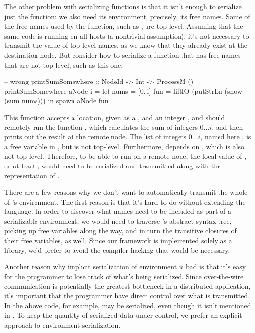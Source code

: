 \documentclass[preprint]{sigplanconf}
\begin{document}
The other problem with serializing functions is that it isn't enough to serialize just the function: we also need its environment, precisely, its free names. Some of the free names used by the  function, such as , are top-level. Assuming that the same code is running on all hosts (a nontrivial assumption), it's not necessary to transmit the value of top-level names, as we know that they already exist at the destination node. But consider how to serialize a function that has free names that are not top-level, such as this one:

\begin{code}
-- wrong
printSumSomewhere :: NodeId -> Int -> ProcessM ()
printSumSomewhere aNode i =
  let nums = [0..i]
      fun = liftIO (putStrLn (show (sum nums)))
   in spawn aNode fun
\end{code}

This function accepts a location, given as a , and an integer , and should remotely run the function , which calculates the sum of integers $0 \ldots i$, and then prints out the result at the remote node. The list of integers $0 \ldots i$, named here , is a free variable in , but is not top-level. Furthermore,  depends on , which is also not top-level. Therefore, to be able to run  on a remote node, the local value of , or at least , would need to be serialized and transmitted along with the representation of .

There are a few reasons why we don't want to automatically transmit the whole of 's environment. The first reason is that it's hard to do without extending the language. In order to discover what names need to be included as part of a serializable environment, we would need to traverse 's abstract syntax tree, picking up free variables along the way, and in turn the transitive closures of their free variables, as well. Since our framework is implemented solely as a library, we'd prefer to avoid the compiler-hacking that would be necessary.

Another reason why implicit serialization of environment is bad is that it's easy for the programmer to lose track of what's being serialized. Since over-the-wire communication is potentially the greatest bottleneck in a distributed application, it's important that the programmer have direct control over what is transmitted. In the above code, for example,  may be serialized, even though it isn't mentioned in . To keep the quantity of serialized data under control, we prefer an explicit approach to environment serialization.
\end{document}
